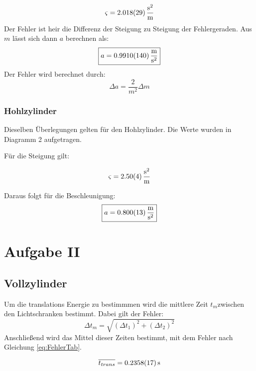 \[\varsigma = \SI{2.018 \pm 0,029}{\frac{\second^2}{\meter}} \]
Der Fehler ist heir die Differenz der Steigung zu Steigung der Fehlergeraden.
Aus $m$ lässt sich dann $a$ berechnen als:
\[\boxed{a = \SI{ 0,9910 \pm 0,014 }{\frac{\meter}{\second^2}}}\]
Der Fehler wird berechnet durch:
\begin{equation}
    \Delta a = \frac{2}{m^2}\Delta m
\end{equation}


\subsubsection{Hohlzylinder}

Dieselben Überlegungen gelten für den Hohlzylinder. Die Werte wurden in Diagramm 2 aufgetragen.

Für die Steigung gilt:

\[\varsigma = \SI{2.50 \pm 0,04}{\frac{\second^2}{\meter}} \]

Daraus folgt für die Beschleunigung:
\[\boxed{a = \SI{ 0,800 \pm 0,013}{\frac{\meter}{\second^2}}}\]


\section{Aufgabe II}

\subsection{Vollzylinder}
Um die translations Energie zu bestimmmen wird die mittlere Zeit $t_m$zwischen den Lichtschranken bestimmt. Dabei gilt der Fehler:
\begin{equation}
    \Delta t_m = \sqrt{(\Delta t_1)^2+ (\Delta t_2)^2}
\end{equation}
Anschließend wird das Mittel dieser Zeiten bestimmt, mit dem Fehler nach Gleichung \ref{eq:FehlerTab}.

\[\overline{t_{trans}} = \SI{0,2358 \pm 0,0017}{\second}\]